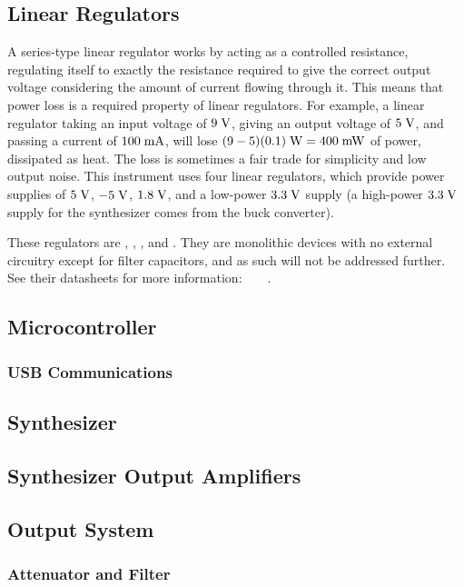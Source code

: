 \subsection{Linear Regulators}
A series-type linear regulator works by acting as a controlled resistance,
regulating itself to exactly the resistance required to give the correct
output voltage considering the amount of current flowing through it. This
means that power loss is a required property of linear regulators. For example,
a linear regulator taking an input voltage of $9\;\mathrm{V}$, giving an output
voltage of $5\;\mathrm{V}$, and passing a current of $100\;\mathrm{mA}$, will
lose $(9-5)(0.1)\;\mathrm{W} = 400\;\mathrm{mW}$ of power, dissipated as heat.
The loss is sometimes a fair trade for simplicity and low output noise.
This instrument uses four linear regulators, which provide power supplies
of $5\;\mathrm{V}$, $-5\;\mathrm{V}$, $1.8\;\mathrm{V}$, and a low-power $3.3\;\mathrm{V}$
supply (a high-power $3.3\;\mathrm{V}$ supply for the synthesizer comes from
the buck converter).

These regulators are , , , and .
They are monolithic devices with no external circuitry except for filter
capacitors, and as such will not be addressed further. See their datasheets for
more information:~\cite{l78m05}~\cite{mc79m00}~\cite{az1117c}~\cite{mcp1700}.

\subsection{Microcontroller}
\subsubsection{USB Communications}

\subsection{Synthesizer}

\subsection{Synthesizer Output Amplifiers}

\subsection{Output System}

\subsubsection{Attenuator and Filter}
